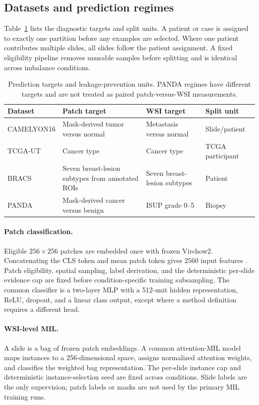 \documentclass[11pt]{article}
\begin{document}
\subsection{Datasets and prediction regimes}
\label{sec:data}
Table~\ref{tab:datasets} lists the diagnostic targets and split units. A patient or case is assigned to exactly one partition before any examples are selected. Where one patient contributes multiple slides, all slides follow the patient assignment. A fixed eligibility pipeline removes unusable samples before splitting and is identical across imbalance conditions.

\begin{table}[ht]
  \centering
  \footnotesize
  \begin{tabularx}{\linewidth}{@{}lXXl@{}}
    \toprule
    Dataset & Patch target & WSI target & Split unit \\
    \midrule
    CAMELYON16 & Mask-derived tumor versus normal & Metastasis versus normal & Slide/patient \\
    TCGA-UT & Cancer type & Cancer type & TCGA participant \\
    BRACS & Seven breast-lesion subtypes from annotated ROIs & Seven breast-lesion subtypes & Patient \\
    PANDA & Mask-derived cancer versus benign & ISUP grade 0--5 & Biopsy \\
    \bottomrule
  \end{tabularx}
  \caption{Prediction targets and leakage-prevention units. PANDA regimes have different targets and are not treated as paired patch-versus-WSI measurements.}
  \label{tab:datasets}
\end{table}

\paragraph{Patch classification.}
Eligible $256\times256$ patches are embedded once with frozen Virchow2. Concatenating the CLS token and mean patch token gives 2560 input features \citep{vorontsov2024virchow,zimmermann2024virchow2}. Patch eligibility, spatial sampling, label derivation, and the deterministic per-slide evidence cap are fixed before condition-specific training subsampling. The common classifier is a two-layer MLP with a 512-unit hidden representation, ReLU, dropout, and a linear class output, except where a method definition requires a different head.

\paragraph{WSI-level MIL.}
A slide is a bag of frozen patch embeddings. A common attention-MIL model maps instances to a 256-dimensional space, assigns normalized attention weights, and classifies the weighted bag representation. The per-slide instance cap and deterministic instance-selection seed are fixed across conditions. Slide labels are the only supervision; patch labels or masks are not used by the primary MIL training runs.
\end{document}
